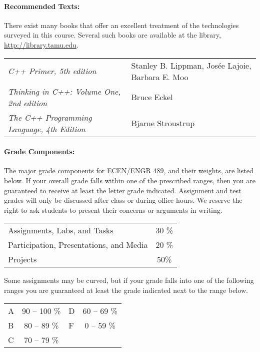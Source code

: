 \documentclass{article}
\begin{document}
\paragraph{Recommended Texts:}
There exist many books that offer an excellent treatment of the technologies surveyed in this course.
Several such books are available at the library, \url{http://library.tamu.edu}.
\begin{center}
\begin{tabular}{ll}
\emph{C++ Primer, 5th edition} & Stanley B. Lippman, Jos\'{e}e Lajoie, Barbara E. Moo \tabularnewline[1mm]
\emph{Thinking in C++: Volume One, 2nd edition} & Bruce Eckel \tabularnewline[1mm]
\emph{The C++ Programming Language, 4th Edition} & Bjarne Stroustrup \tabularnewline[1mm]
\end{tabular}
\end{center}

\paragraph{Grade Components:}
The major grade components for ECEN/ENGR 489, and their weights, are listed below.
If your overall grade falls within one of the prescribed ranges, then you are guaranteed to receive at least the letter grade indicated.
Assignment and test grades will only be discussed after class or during office hours.
We reserve the right to ask students to present their concerns or arguments in writing.
\begin{center}
\begin{tabular}{lc}
Assignments, Labs, and Tasks & 30 \% \\
Participation, Presentations, and Media & 20 \% \\
Projects & 50\%
\end{tabular}
\end{center}
Some assignments may be curved, but if your grade falls into one of the following ranges you are guaranteed at least the grade indicated next to the range below.
\begin{center}
\begin{tabular}{lclc}
A & 90 -- 100 \% & D & 60 -- 69 \% \\
B & 80 -- 89 \% & F & 0 -- 59 \% \\
C & 70 -- 79 \%
\end{tabular}
\end{center}
\end{document}

